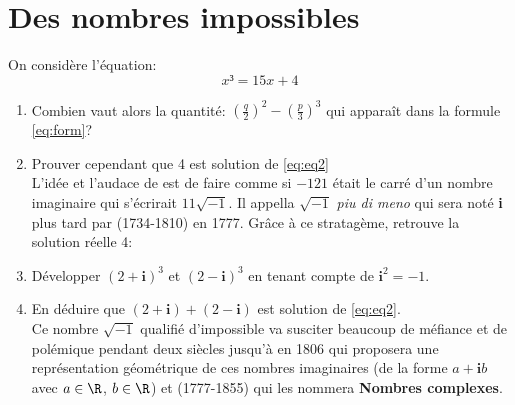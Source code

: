 \documentclass[a4paper]{article}
\renewcommand{\i}{\textbf{i}}
\begin{document}
\section{Des nombres impossibles}
On consid\`ere l'\'equation:
  \begin{equation}
    \label{eq:eq2}
    x³=15x+4
  \end{equation}
  \begin{enumerate}
  \item Combien vaut alors la quantit\'e:
    $\left(\frac{q}{2}\right)^2-\left(\frac{p}{3}\right)^3$ qui
    appara\^it dans la formule \eqref{eq:form}?
  \item Prouver cependant que 4 est solution de \eqref{eq:eq2}\\
L'id\'ee et l'audace de  est de faire comme si $-121$
\'etait le carr\'e d'un nombre imaginaire qui s'\'ecrirait
$11\sqrt{-1}$. Il appella $\sqrt{-1}$ \emph{piu di meno} qui sera not\'e
\textbf{i} plus tard par (1734-1810) en 1777. Gr\^ace \`a ce stratag\`eme, retrouve la solution r\'eelle 4:

\item D\'evelopper $(2+\i)^3$ et $(2-\i)^3$ en tenant compte de $\i^2=-1$.
\item En d\'eduire que $(2+\i)+(2-\i)$ est solution de
  \eqref{eq:eq2}.\\
Ce nombre \og $\sqrt{-1}$ \fg{} qualifi\'e d'impossible va susciter beaucoup de m\'efiance et
de pol\'emique pendant deux si\`ecles jusqu'\`a  en 1806 qui
proposera une repr\'esentation g\'eom\'etrique de ces nombres
imaginaires (de la forme $a+\i b$ avec $a\in\R$, $b\in\R$) et (1777-1855) qui les
nommera \textbf{Nombres complexes}.
  \end{enumerate}
\end{document}
